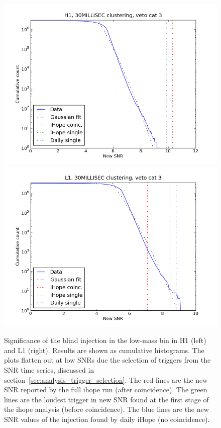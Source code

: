 \begin{figure}
  \includegraphics[width=0.5\linewidth]{figures/detchar/LM_H1_30MILLISEC_3_hist.png}
  \includegraphics[width=0.5\linewidth]{figures/detchar/LM_L1_30MILLISEC_3_hist.png}
  \caption[Significance of the injection in the low-mass bin]{
  \label{f:daily_histogram_low}
Significance of the blind injection in the low-mass bin in H1 (left)
and L1 (right). Results are shown as cumulative histograms.  The plots
flatten out at low SNRs due the selection of triggers from the SNR
time series, discussed in
section~\ref{sec:analysis_trigger_selection}.  The red lines are the
new SNR reported by the full ihope run (after coincidence).  The green
lines are the loudest trigger in new SNR found at the first stage of
the ihope analysis (before coincidence).  The blue lines are the new
SNR values of the injection found by daily iHope (no coincidence).}
\end{figure}%




